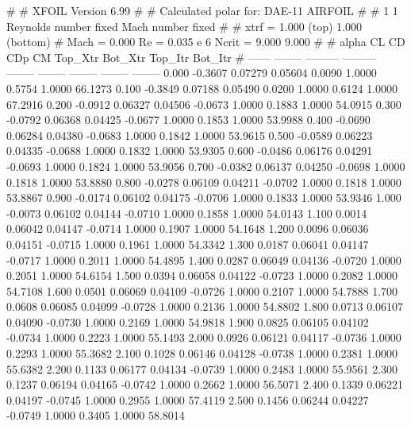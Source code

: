 #  
#       XFOIL         Version 6.99
#  
# Calculated polar for: DAE-11 AIRFOIL                                  
#  
# 1 1 Reynolds number fixed          Mach number fixed         
#  
# xtrf =   1.000 (top)        1.000 (bottom)  
# Mach =   0.000     Re =     0.035 e 6     Ncrit =   9.000  9.000
#  
#   alpha    CL        CD       CDp       CM     Top_Xtr  Bot_Xtr  Top_Itr  Bot_Itr
#  ------ -------- --------- --------- -------- -------- -------- -------- --------
   0.000  -0.3607   0.07279   0.05604   0.0090   1.0000   0.5754   1.0000  66.1273
   0.100  -0.3849   0.07188   0.05490   0.0200   1.0000   0.6124   1.0000  67.2916
   0.200  -0.0912   0.06327   0.04506  -0.0673   1.0000   0.1883   1.0000  54.0915
   0.300  -0.0792   0.06368   0.04425  -0.0677   1.0000   0.1853   1.0000  53.9988
   0.400  -0.0690   0.06284   0.04380  -0.0683   1.0000   0.1842   1.0000  53.9615
   0.500  -0.0589   0.06223   0.04335  -0.0688   1.0000   0.1832   1.0000  53.9305
   0.600  -0.0486   0.06176   0.04291  -0.0693   1.0000   0.1824   1.0000  53.9056
   0.700  -0.0382   0.06137   0.04250  -0.0698   1.0000   0.1818   1.0000  53.8880
   0.800  -0.0278   0.06109   0.04211  -0.0702   1.0000   0.1818   1.0000  53.8867
   0.900  -0.0174   0.06102   0.04175  -0.0706   1.0000   0.1833   1.0000  53.9346
   1.000  -0.0073   0.06102   0.04144  -0.0710   1.0000   0.1858   1.0000  54.0143
   1.100   0.0014   0.06042   0.04147  -0.0714   1.0000   0.1907   1.0000  54.1648
   1.200   0.0096   0.06036   0.04151  -0.0715   1.0000   0.1961   1.0000  54.3342
   1.300   0.0187   0.06041   0.04147  -0.0717   1.0000   0.2011   1.0000  54.4895
   1.400   0.0287   0.06049   0.04136  -0.0720   1.0000   0.2051   1.0000  54.6154
   1.500   0.0394   0.06058   0.04122  -0.0723   1.0000   0.2082   1.0000  54.7108
   1.600   0.0501   0.06069   0.04109  -0.0726   1.0000   0.2107   1.0000  54.7888
   1.700   0.0608   0.06085   0.04099  -0.0728   1.0000   0.2136   1.0000  54.8802
   1.800   0.0713   0.06107   0.04090  -0.0730   1.0000   0.2169   1.0000  54.9818
   1.900   0.0825   0.06105   0.04102  -0.0734   1.0000   0.2223   1.0000  55.1493
   2.000   0.0926   0.06121   0.04117  -0.0736   1.0000   0.2293   1.0000  55.3682
   2.100   0.1028   0.06146   0.04128  -0.0738   1.0000   0.2381   1.0000  55.6382
   2.200   0.1133   0.06177   0.04134  -0.0739   1.0000   0.2483   1.0000  55.9561
   2.300   0.1237   0.06194   0.04165  -0.0742   1.0000   0.2662   1.0000  56.5071
   2.400   0.1339   0.06221   0.04197  -0.0745   1.0000   0.2955   1.0000  57.4119
   2.500   0.1456   0.06244   0.04227  -0.0749   1.0000   0.3405   1.0000  58.8014

